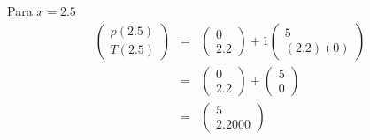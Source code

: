 \documentclass[12pt]{article}
\begin{document}
\begin{enumerate}[leftmargin=*,widest=9]
    Para $x= 2.5$
    \begin{eqnarray*}
    	\begin{pmatrix}
			\rho(2.5) \\ T(2.5)
		\end{pmatrix}
    &=& \begin{pmatrix}
    0 \\ 2.2
    \end{pmatrix} + 1 \begin{pmatrix}
    5 \\ (2.2)(0)
    \end{pmatrix} \\
     &=& \begin{pmatrix}
    0 \\ 2.2
    \end{pmatrix} + \begin{pmatrix}
    5 \\ 0
    \end{pmatrix} \\
   	&=& \begin{pmatrix}
    5 \\ 2.2000
    \end{pmatrix}
    \end{eqnarray*}





\end{enumerate}
\end{document}
